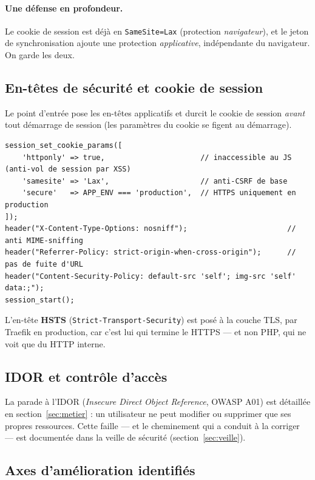 \paragraph{Une défense en profondeur.} Le cookie de session est déjà en \texttt{SameSite=Lax}
(protection \emph{navigateur}), et le jeton de synchronisation ajoute une protection
\emph{applicative}, indépendante du navigateur. On garde les deux.

\subsection{En-têtes de sécurité et cookie de session}

Le point d'entrée  pose les en-têtes applicatifs et durcit le cookie de
session \emph{avant} tout démarrage de session (les paramètres du cookie se figent au démarrage).

\begin{lstlisting}[style=php, caption={En-têtes et cookie de session — \file{public/index.php}}]
session_set_cookie_params([
    'httponly' => true,                      // inaccessible au JS (anti-vol de session par XSS)
    'samesite' => 'Lax',                     // anti-CSRF de base
    'secure'   => APP_ENV === 'production',  // HTTPS uniquement en production
]);
header("X-Content-Type-Options: nosniff");                       // anti MIME-sniffing
header("Referrer-Policy: strict-origin-when-cross-origin");      // pas de fuite d'URL
header("Content-Security-Policy: default-src 'self'; img-src 'self' data:;");
session_start();
\end{lstlisting}

L'en-tête \textbf{HSTS} (\texttt{Strict-Transport-Security}) est posé à la couche TLS, par
Traefik en production, car c'est lui qui termine le HTTPS — et non PHP, qui ne voit que du HTTP
interne.

\subsection{IDOR et contrôle d'accès}

La parade à l'IDOR (\emph{Insecure Direct Object Reference}, OWASP A01) est détaillée en
section~\ref{sec:metier} : un utilisateur ne peut modifier ou supprimer que ses propres
ressources. Cette faille — et le cheminement qui a conduit à la corriger — est documentée dans la
veille de sécurité (section~\ref{sec:veille}).

\subsection{Axes d'amélioration identifiés}
\label{sec:secu-axes}

